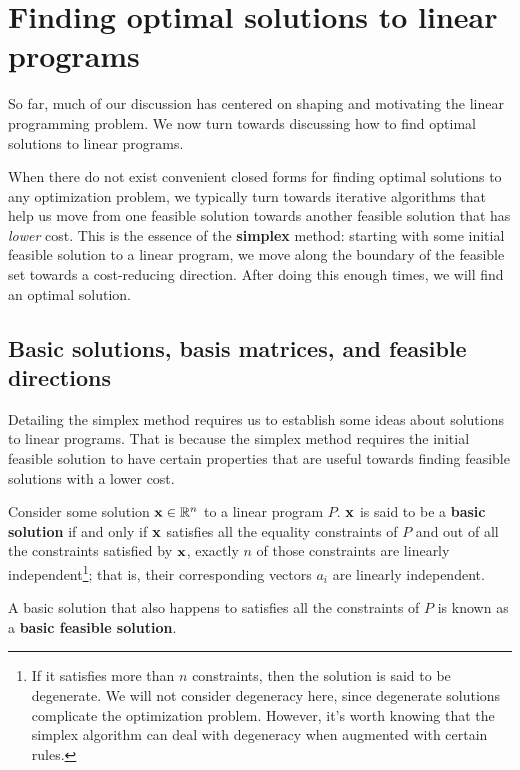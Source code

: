 \documentclass{paper}
\newenvironment{definition}[2][Definition]{\begin{trivlist}
\item[\hskip \labelsep {\bfseries #1}\hskip \labelsep {\bfseries #2.}]}{\end{trivlist}}
\newenvironment{ybox}{\begin{tcolorbox}[breakable,colback=yellow!20!white,colframe=brown!100!black]}{\end{tcolorbox}}
\begin{document}
\section{Finding optimal solutions to linear programs}

So far, much of our discussion has centered on shaping and motivating the linear programming problem. We now turn towards discussing how to find optimal solutions to linear programs. 

\medskip
When there do not exist convenient closed forms for finding optimal solutions to any optimization problem, we typically turn towards iterative algorithms that help us move from one feasible solution towards another feasible solution that has \textit{lower} cost. This is the essence of the \textbf{simplex} method: starting with some initial feasible solution to a linear program, we move along the boundary of the feasible set towards a cost-reducing direction. After doing this enough times, we will find an optimal solution. 

\subsection{Basic solutions, basis matrices, and feasible directions}

Detailing the simplex method requires us to establish some ideas about solutions to linear programs. That is because the simplex method requires the initial feasible solution to have certain properties that are useful towards finding feasible solutions with a lower cost.

\bigskip
\begin{ybox}
    \begin{definition}{(Basic solution)}
        Consider some solution $\bold{x} \in \mathbb{R}^n$ to a linear program $P$. $\bold{x}$ is said to be a \textbf{basic solution} if and only if $\bold{x}$ satisfies all the equality constraints of $P$ and out of all the constraints satisfied by $\bold{x}$, exactly $n$ of those constraints are linearly independent\footnote{If it satisfies more than $n$ constraints, then the solution is said to be degenerate. We will not consider degeneracy here, since degenerate solutions complicate the optimization problem. However, it's worth knowing that the simplex algorithm can deal with degeneracy when augmented with certain rules.}; that is, their corresponding vectors $a_i$ are linearly independent.
        
        \medskip
        A basic solution that also happens to satisfies all the constraints of $P$ is known as a \textbf{basic feasible solution}.
    \end{definition}
\end{ybox}
\end{document}
